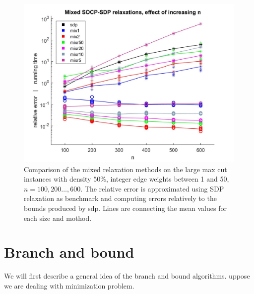 \documentclass[12pt]{book}
\theoremstyle{definition}
\begin{document}
\begin{center}
\begin{figure}
\includegraphics[scale=0.27]{img/comp_mix_n_100-600.jpg}
\caption[Comparison of relaxations - large, dense instances of max cut 2]{Comparison of the mixed relaxation methods on the large max cut instances with density  $50\%$, integer edge weights between 1 and 50, $n=100,200\dots ,600$. The relative error is approximated using SDP relaxation as benchmark and computing errors relatively to the bounds produced by sdp. Lines are connecting the mean values for each size and mothod.} 
\label{comp3size}
\end{figure}
\end{center}




\newpage
\section{Branch and bound}
\label{SectionBranchAndBound}



We will first describe a general idea of the branch and bound algorithms.  uppose we are dealing with minimization problem.
\end{document}
